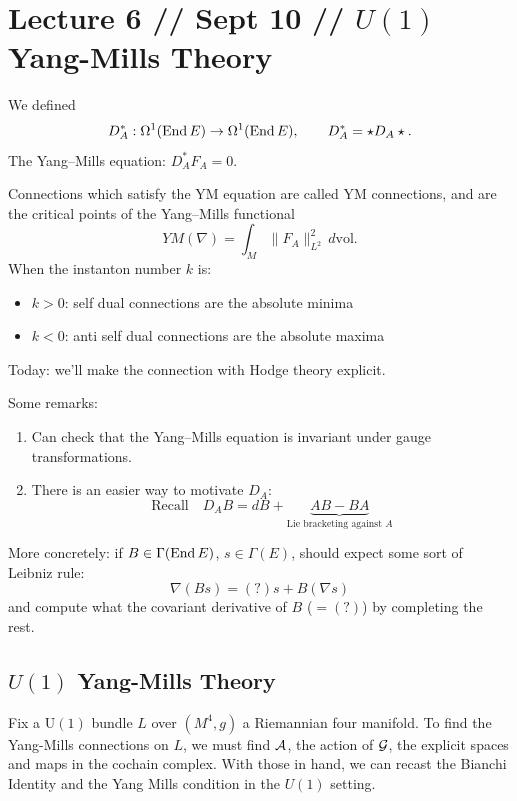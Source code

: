 \documentclass[main]{subfiles}
\begin{document}
\section*{Lecture 6 // Sept 10 // $U(1)$ Yang-Mills Theory}

\begin{recall}
We defined
\[
D_A^\ast : \Omega^1(\operatorname{End} E) \to \Omega^1(\operatorname{End} E), \qquad D_A^\ast = \star D_A \star.
\]
The Yang--Mills equation: $D_A^\ast F_A = 0$.

Connections which satisfy the YM equation are called YM connections, and are the critical points of the Yang--Mills functional
\[
YM(\nabla) = \int_M \|F_A\|_{L^2}^2\, d\mathrm{vol}.
\]
When the instanton number $k$ is:
\begin{itemize}
	\item $k>0$: self dual connections are the absolute minima
	\item $k<0$: anti self dual connections are the absolute maxima
\end{itemize}

Today: we'll make the connection with Hodge theory explicit.
\end{recall}

Some remarks:
\begin{enumerate}
	\item Can check that the Yang--Mills equation is invariant under gauge transformations.
	\item There is an easier way to motivate $D_A$:
	\[
	\text{Recall} \quad D_A B = dB + \underbrace{AB-BA}_{\text{Lie bracketing against } A}
	\]
\end{enumerate}

More concretely: if $B \in \Gamma(\operatorname{End} E)$, $s \in \Gamma(E)$, should expect some sort of Leibniz rule:
\[
\nabla(Bs) = (?)s + B(\nabla s)
\]
and compute what the covariant derivative of $B$ ($=(?)$) by completing the rest.

\bigskip
\subsection*{$U(1)$ Yang-Mills Theory}

Fix a $\mathrm{U}(1)$ bundle $L$ over $(M^4,g)$ a Riemannian four manifold. To find the Yang-Mills connections on $L$, we must find $\mathcal{A}$, the action of $\mathcal{G}$, the explicit spaces and maps in the cochain complex. With those in hand, we can recast the Bianchi Identity and the Yang Mills condition in the $U(1)$ setting. 
\end{document}
